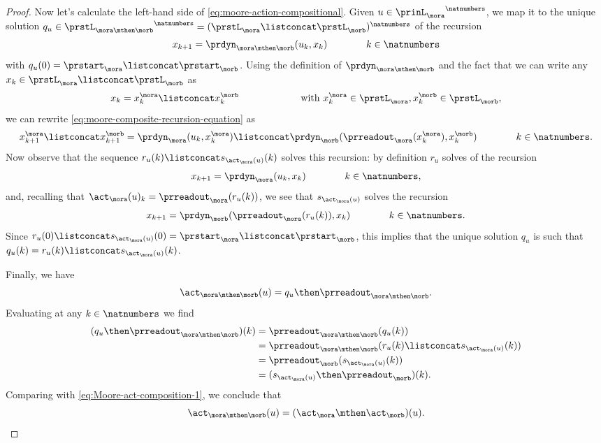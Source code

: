 \begin{proof}
Now let's calculate the left-hand side of \cref{eq:moore-action-compositional}. Given $u \in {\prinL_{\mora}}^\natnumbers$, we map it to the unique solution $q_u \in {\prstL_{\mora \mthen \morb}}^\natnumbers = ({\prstL_{\mora} \listconcat \prstL_{\morb}})^\natnumbers$ of the recursion 
\begin{equation}
\label{eq:moore-composite-recursion-equation}
        x_{k+1} = \prdyn_{\mora \mthen \morb}(u_k, x_k)  \qquad \qquad k \in \natnumbers
\end{equation}
with $q_u(0) = \prstart_{\mora} \listconcat \prstart_{\morb}$. Using the definition of $\prdyn_{\mora \mthen \morb}$ and the fact that we can write any $x_k \in \prstL_{\mora} \listconcat \prstL_{\morb}$ as 
$$x_k = x^\mora_k \listconcat x^\morb_k \qquad \qquad \qquad \text{ with } x^\mora_k \in \prstL_{\mora}, x^\morb_k \in \prstL_{\morb},$$ 
we can rewrite \cref{eq:moore-composite-recursion-equation} as
\begin{equation}
        x^\mora_{k+1} \listconcat x^\morb_{k+1} = \prdyn_{\mora}(u_k, x^\mora_k) \listconcat \prdyn_{\morb}(\prreadout_\mora(x^\mora_k), x^\morb_k)  \qquad \qquad k \in \natnumbers.
\end{equation}
Now observe that the sequence $r_u(k) \listconcat s_{\act_\mora(u)}(k)$ solves this recursion: by definition $r_u$ solves of the recursion
\begin{equation}
        x_{k+1} = \prdyn_\mora(u_k, x_k)  \qquad \qquad k \in \natnumbers,
\end{equation}
and, recalling that $\act_\mora(u)_k = \prreadout_\mora(r_u(k))$, we see that $s_{\act_\mora(u)}$ solves the recursion  
\begin{equation}
        x_{k+1} = \prdyn_\morb(\prreadout_\mora(r_u(k)), x_k)  \qquad \qquad k \in \natnumbers.
\end{equation}
Since $r_u(0) \listconcat s_{\act_\mora(u)}(0) = \prstart_{\mora} \listconcat \prstart_{\morb}$, this implies that the unique solution $q_u$ is such that $q_u(k) = r_u(k) \listconcat s_{\act_\mora(u)}(k)$. 

Finally, we have
\begin{equation}
\act_{\mora \mthen \morb}(u) = q_u \then \prreadout_{\mora \mthen \morb}.
\end{equation}
Evaluating at any $k \in \natnumbers$ we find 
\begin{align}
(q_u \then \prreadout_{\mora \mthen \morb})(k) &= \prreadout_{\mora \mthen \morb}(q_u(k)) \\
& = \prreadout_{\mora \mthen \morb}(r_u(k) \listconcat s_{\act_\mora(u)}(k)) \\
&= \prreadout_{\morb}(s_{\act_\mora(u)}(k)) \\
& = (s_{\act_\mora(u)} \then \prreadout_{\morb})(k).
\end{align}
Comparing with \cref{eq:Moore-act-composition-1}, we conclude that 
\begin{equation}
\act_{\mora \mthen \morb}(u) = (\act_\mora \mthen \act_\morb)(u). 
\end{equation}
\end{proof}

